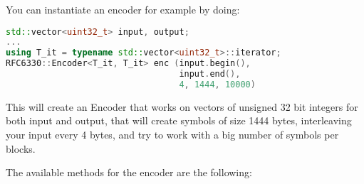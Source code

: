 \documentclass[11pt,a4paper]{refart}
\begin{document}
You can instantiate an encoder for example by doing:

\begin{lstlisting}[language=C++]
std::vector<uint32_t> input, output;
...
using T_it = typename std::vector<uint32_t>::iterator;
RFC6330::Encoder<T_it, T_it> enc (input.begin(),
                                  input.end(),
                                  4, 1444, 10000)
\end{lstlisting}

This will create an Encoder that works on vectors of unsigned 32 bit integers for both input and output, that will create symbols of size 1444 bytes, interleaving
your input every 4 bytes, and try to work with a big number of symbols per blocks.

The available methods for the encoder are the following:
\end{document}
